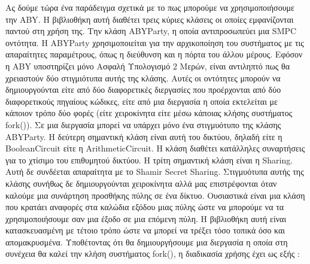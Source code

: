 Ας δούμε τώρα ένα παράδειγμα σχετικά με το πως μπορούμε να χρησιμοποιήσουμε την ABY. Η βιβλιοθήκη αυτή διαθέτει τρεις κύριες κλάσεις οι οποίες εμφανίζονται παντού στη χρήση της. Την κλάση ABYParty, η οποία αντιπροσωπεύει μια SMPC οντότητα. Η ABYParty χρησιμοποιείται για την αρχικοποίηση του συστήματος με τις απαραίτητες παραμέτρους, όπως η διεύθυνση και η πόρτα του άλλου μέρους. Εφόσον η ABY υποστηρίζει μόνο Ασφαλή Υπολογισμό 2 Μερών, είναι αντιληπτό πως θα χρειαστούν δύο στιγμιότυπα αυτής της κλάσης. Αυτές οι οντότητες μπορούν να δημιουργούνται είτε από δύο διαφορετικές διεργασίες που προέρχονται από δύο διαφορετικούς πηγαίους κώδικες, είτε από μια διεργασία η οποία εκτελείται με κάποιον τρόπο δύο φορές (είτε χειροκίνητα είτε μέσω κάποιας κλήσης συστήματος fork()). Σε μια διεργασία μπορεί να υπάρχει μόνο ένα στιγμυότυπο της κλάσης ABYParty. Η δεύτερη σημαντική κλάση είναι αυτή του δικτύου, δηλαδή είτε η BooleanCircuit είτε η ArithmeticCircuit. Η κλάση διαθέτει κατάλληλες συναρτήσεις για το χτίσιμο του επιθυμητού δικτύου. Η τρίτη σημαντική κλάση είναι η Sharing. Αυτή δε συνδέεται απαραίτητα με το Shamir Secret Sharing. Στιγμυότυπα αυτής της κλάσης συνήθως δε δημιουργούνται χειροκίνητα αλλά μας επιστρέφονται όταν καλούμε μια συνάρτηση προσθήκης πύλης σε ένα δίκτυο. Ουσιαστικά είναι μια κλάση που κρατάει αναφορές στα καλώδια εξόδου μιας πύλης ώστε να μπορούμε να τα χρησιμοποιήσουμε σαν μια έξοδο σε μια επόμενη πύλη. Η βιβλιοθήκη αυτή είναι κατασκευασμένη με τέτοιο τρόπο ώστε να μπορεί να τρέξει τόσο τοπικά όσο και απομακρυσμένα. Υποθέτοντας ότι θα δημιουργήσουμε μια διεργασία η οποία στη συνέχεια θα καλεί την κλήση συστήματος fork(), η διαδικασία χρήσης έχει ως εξής :

